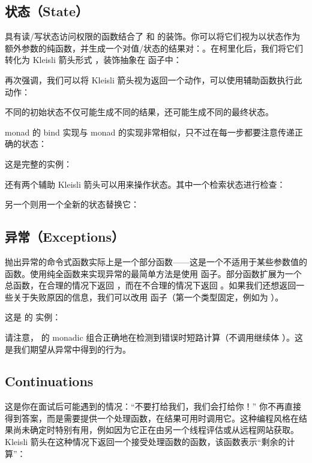 
\subsection{状态（State）}

具有读/写状态访问权限的函数结合了  和  的装饰。你可以将它们视为以状态作为额外参数的纯函数，并生成一个对值/状态的结果对：。在柯里化后，我们将它们转化为 Kleisli 箭头形式 ，装饰抽象在  函子中：

再次强调，我们可以将 Kleisli 箭头视为返回一个动作，可以使用辅助函数执行此动作：

不同的初始状态不仅可能生成不同的结果，还可能生成不同的最终状态。

 monad 的 bind 实现与  monad 的实现非常相似，只不过在每一步都要注意传递正确的状态：

这是完整的实例：

还有两个辅助 Kleisli 箭头可以用来操作状态。其中一个检索状态进行检查：

另一个则用一个全新的状态替换它：


\subsection{异常（Exceptions）}

抛出异常的命令式函数实际上是一个部分函数——这是一个不适用于某些参数值的函数。使用纯全函数来实现异常的最简单方法是使用  函子。部分函数扩展为一个总函数，在合理的情况下返回 ，而在不合理的情况下返回 。如果我们还想返回一些关于失败原因的信息，我们可以改用  函子（第一个类型固定，例如为 ）。

这是  的  实例：

请注意， 的 monadic 组合正确地在检测到错误时短路计算（不调用继续体 ）。这是我们期望从异常中得到的行为。

\subsection{Continuations}

这是你在面试后可能遇到的情况：“不要打给我们，我们会打给你！” 你不再直接得到答案，而是需要提供一个处理函数，在结果可用时调用它。这种编程风格在结果尚未确定时特别有用，例如因为它正在由另一个线程评估或从远程网站获取。Kleisli 箭头在这种情况下返回一个接受处理函数的函数，该函数表示“剩余的计算”：

